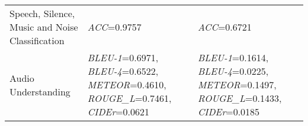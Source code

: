 \begin{longtable}[hbtp]{p{4.6cm}<{\raggedright}p{4.5cm}<{\raggedright}p{4.5cm}<{\raggedright}}
    \midrule
    Speech, Silence, Music and Noise Classification & \textit{ACC}=0.9757 &	\textit{ACC}=0.6721\\
    Audio Understanding & \textit{BLEU-1}=0.6971, \textit{BLEU-4}=0.6522, \textit{METEOR}=0.4610, \textit{ROUGE\_L}=0.7461, \textit{CIDEr}=0.0621 & \textit{BLEU-1}=0.1614, \textit{BLEU-4}=0.0225, \textit{METEOR}=0.1497, \textit{ROUGE\_L}=0.1433, \textit{CIDEr}=0.0185 \\
    \bottomrule

\end{longtable}